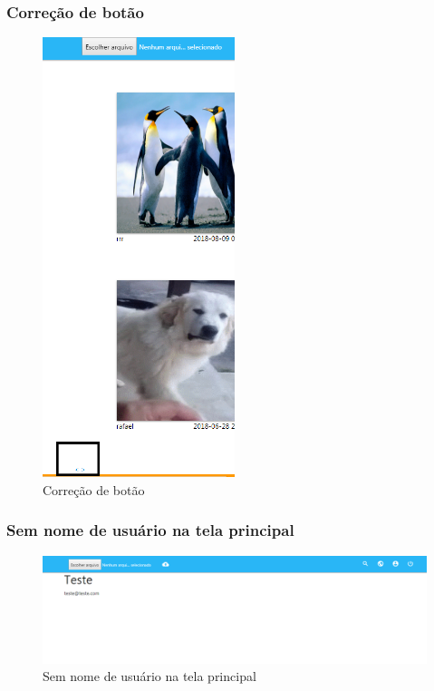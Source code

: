 \subsubsection{Correção de botão}
\begin{figure}[ht]
	\centering
	\includegraphics[width=0.5\textwidth]{./imagens/paginas.png}
	\caption{Correção de botão}
	\label{fig:casoDeUso}
\end{figure}

\pagebreak


\subsubsection{Sem nome de usuário na tela principal}
\begin{figure}[ht]
	\centering
	\includegraphics[width=\textwidth]{./imagens/perfil_desarrumado.png}
	\caption{Sem nome de usuário na tela principal}
	\label{fig:casoDeUso}
\end{figure}


